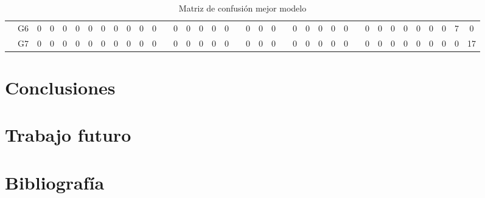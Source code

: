 \documentclass[12pt]{article}
\begin{document}
\begin{table}[!ht]
{\begin{tabular}{cccccccccccccccccccccccccccccccccccccc}
\multicolumn{1}{c|}{}                       & \multicolumn{1}{c|}{G6}  & \multicolumn{1}{c|}{0}  & \multicolumn{1}{c|}{0}  & \multicolumn{1}{c|}{0}  & \multicolumn{1}{c|}{0}  & \multicolumn{1}{c|}{0}  & \multicolumn{1}{c|}{0}  & \multicolumn{1}{c|}{0}  & \multicolumn{1}{c|}{0}  & \multicolumn{1}{c|}{0}  & \multicolumn{1}{c|}{0}  & \multicolumn{1}{c|}{}                     & \multicolumn{1}{c|}{0}  & \multicolumn{1}{c|}{0}  & \multicolumn{1}{c|}{0}  & \multicolumn{1}{c|}{0}  & \multicolumn{1}{c|}{0}  & \multicolumn{1}{c|}{}                     & \multicolumn{1}{c|}{0}  & \multicolumn{1}{c|}{0}  & \multicolumn{1}{c|}{0}  & \multicolumn{1}{c|}{}                     & \multicolumn{1}{c|}{0}  & \multicolumn{1}{c|}{0}  & \multicolumn{1}{c|}{0}  & \multicolumn{1}{c|}{0}  & \multicolumn{1}{c|}{0}  & \multicolumn{1}{c|}{}                     & \multicolumn{1}{c|}{0}  & \multicolumn{1}{c|}{0}  & \multicolumn{1}{c|}{0}  & \multicolumn{1}{c|}{0}  & \multicolumn{1}{c|}{0}  & \multicolumn{1}{c|}{0}  & \multicolumn{1}{c|}{0}  & \multicolumn{1}{c|}{7}  & \multicolumn{1}{c|}{0}  \\ \cline{2-12} \cline{14-18} \cline{20-22} \cline{24-28} \cline{30-38} 
\multicolumn{1}{c|}{}                       & \multicolumn{1}{c|}{G7}  & \multicolumn{1}{c|}{0}  & \multicolumn{1}{c|}{0}  & \multicolumn{1}{c|}{0}  & \multicolumn{1}{c|}{0}  & \multicolumn{1}{c|}{0}  & \multicolumn{1}{c|}{0}  & \multicolumn{1}{c|}{0}  & \multicolumn{1}{c|}{0}  & \multicolumn{1}{c|}{0}  & \multicolumn{1}{c|}{0}  & \multicolumn{1}{c|}{}                     & \multicolumn{1}{c|}{0}  & \multicolumn{1}{c|}{0}  & \multicolumn{1}{c|}{0}  & \multicolumn{1}{c|}{0}  & \multicolumn{1}{c|}{0}  & \multicolumn{1}{c|}{}                     & \multicolumn{1}{c|}{0}  & \multicolumn{1}{c|}{0}  & \multicolumn{1}{c|}{0}  & \multicolumn{1}{c|}{}                     & \multicolumn{1}{c|}{0}  & \multicolumn{1}{c|}{0}  & \multicolumn{1}{c|}{0}  & \multicolumn{1}{c|}{0}  & \multicolumn{1}{c|}{0}  & \multicolumn{1}{c|}{}                     & \multicolumn{1}{c|}{0}  & \multicolumn{1}{c|}{0}  & \multicolumn{1}{c|}{0}  & \multicolumn{1}{c|}{0}  & \multicolumn{1}{c|}{0}  & \multicolumn{1}{c|}{0}  & \multicolumn{1}{c|}{0}  & \multicolumn{1}{c|}{0}  & \multicolumn{1}{c|}{17} \\ \cline{2-38} 
		\end{tabular}
	}
	\caption{Matriz de confusión mejor modelo }
	\label{tab:confusion_matrix_3}
\end{table}

\newpage
\section{Conclusiones}
\label{Conclusiones}

\section{Trabajo futuro}
\label{Trabajo futuro}

\section{Bibliografía}
\label{Bibliografía}
\printbibliography
\end{document}
